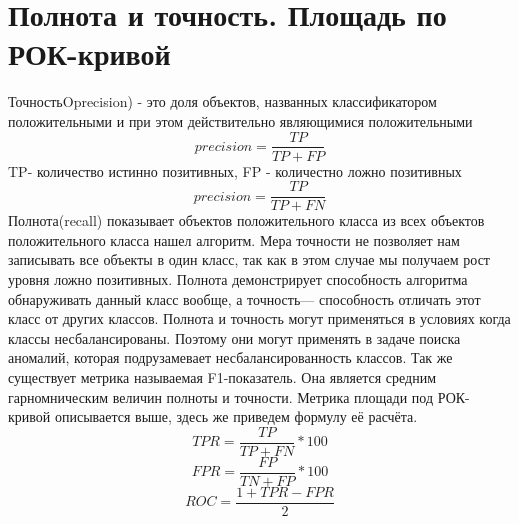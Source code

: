 \section{Полнота и точность. Площадь по РОК-кривой}
ТочностьOprecision) - это доля объектов, названных классификатором положительными и при этом действительно являющимися положительными
	\begin{equation}
precision= \frac{TP}{TP+FP}
	\end{equation}
TP- количество истинно позитивных, FP - количестно ложно позитивных
	\begin{equation}
	precision= \frac{TP}{TP+FN}
	\end{equation}
	Полнота(recall) показывает объектов положительного класса из всех объектов положительного класса нашел алгоритм.
	Мера точности не позволяет нам записывать все объекты в один класс, так как в этом случае мы получаем рост уровня ложно позитивных. Полнота демонстрирует способность алгоритма обнаруживать данный класс вообще, а точность— способность отличать этот класс от других классов. Полнота и точность могут применяться в условиях когда классы несбалансированы\cite{def06}. Поэтому они могут применять в задаче поиска аномалий, которая подрузамевает несбалансированность классов.
	Так же существует метрика называемая F1-показатель. Она является средним гарномническим величин полноты и точности.
	Метрика площади под РОК-кривой описывается выше, здесь же приведем формулу её расчёта.
	\begin{equation}
	TPR=\frac{TP}{TP+FN}*100
	\end{equation}
		\begin{equation}
	FPR=\frac{FP}{TN+FP}*100 
		\end{equation}
		\begin{equation}
	ROC=\frac{1 + TPR - FPR}{2} 
		\end{equation}
	
